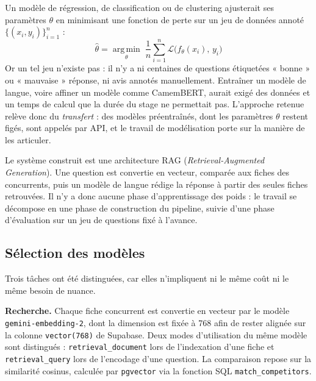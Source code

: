 Un modèle de régression, de classification ou de clustering ajusterait ses paramètres $\theta$ en minimisant
une fonction de perte sur un jeu de données annoté $\{(x_i, y_i)\}_{i=1}^{n}$ :
\begin{equation}
    \hat{\theta} = \operatorname*{arg\,min}_{\theta} \; \frac{1}{n} \sum_{i=1}^{n} \mathcal{L}\big(f_{\theta}(x_i),\, y_i\big)
    \label{eq:supervise}
\end{equation}
Or un tel jeu n'existe pas : il n'y a ni centaines de questions étiquetées « bonne » ou « mauvaise »
réponse, ni avis annotés manuellement. Entraîner un modèle de langue, voire affiner un modèle comme
CamemBERT, aurait exigé des données et un temps de calcul que la durée du stage ne permettait pas. L'approche
retenue relève donc du \textit{transfert} : des modèles préentraînés, dont les paramètres $\theta$ restent
figés, sont appelés par API, et le travail de modélisation porte sur la manière de les articuler.

Le système construit est une architecture RAG (\textit{Retrieval-Augmented Generation}). Une question est
convertie en vecteur, comparée aux fiches des concurrents, puis un modèle de langue rédige la réponse à partir
des seules fiches retrouvées. Il n'y a donc aucune phase d'apprentissage des poids : le travail se décompose
en une phase de construction du pipeline, suivie d'une phase d'évaluation sur un jeu de questions fixé à
l'avance.

\subsection{Sélection des modèles}

Trois tâches ont été distinguées, car elles n'impliquent ni le même coût ni le même besoin de nuance.

\textbf{Recherche.} Chaque fiche concurrent est convertie en vecteur par le modèle
\texttt{gemini-embedding-2}, dont la dimension est fixée à 768 afin de rester alignée sur la colonne
\texttt{vector(768)} de Supabase. Deux modes d'utilisation du même modèle sont distingués :
\texttt{retrieval\_document} lors de l'indexation d'une fiche et \texttt{retrieval\_query} lors de
l'encodage d'une question. La comparaison repose sur la similarité cosinus, calculée par \texttt{pgvector} via
la fonction SQL \texttt{match\_competitors}.


